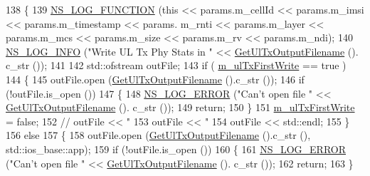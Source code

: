 \begin{DoxyCode}
138 \{
139   \hyperlink{log-macros-disabled_8h_a90b90d5bad1f39cb1b64923ea94c0761}{NS\_LOG\_FUNCTION} (\textcolor{keyword}{this} << params.m\_cellId << params.m\_imsi << params.m\_timestamp << params.
      m\_rnti << params.m\_layer << params.m\_mcs << params.m\_size << params.m\_rv << params.m\_ndi);
140   \hyperlink{group__logging_gafbd73ee2cf9f26b319f49086d8e860fb}{NS\_LOG\_INFO} (\textcolor{stringliteral}{"Write UL Tx Phy Stats in "} << \hyperlink{classns3_1_1PhyTxStatsCalculator_aeb929250f3932735ed8d7617f827cccc}{GetUlTxOutputFilename} ().
      c\_str ());
141 
142   std::ofstream outFile;
143   \textcolor{keywordflow}{if} ( \hyperlink{classns3_1_1PhyTxStatsCalculator_a1328443e41261755f0d22cdeef281ef5}{m\_ulTxFirstWrite} == \textcolor{keyword}{true} )
144     \{
145       outFile.open (\hyperlink{classns3_1_1PhyTxStatsCalculator_aeb929250f3932735ed8d7617f827cccc}{GetUlTxOutputFilename} ().c\_str ());
146       \textcolor{keywordflow}{if} (!outFile.is\_open ())
147         \{
148           \hyperlink{group__logging_ga0261a8db1d4ac5f79417d117634fd455}{NS\_LOG\_ERROR} (\textcolor{stringliteral}{"Can't open file "} << \hyperlink{classns3_1_1PhyTxStatsCalculator_aeb929250f3932735ed8d7617f827cccc}{GetUlTxOutputFilename} ().
      c\_str ());
149           \textcolor{keywordflow}{return};
150         \}
151       \hyperlink{classns3_1_1PhyTxStatsCalculator_a1328443e41261755f0d22cdeef281ef5}{m\_ulTxFirstWrite} = \textcolor{keyword}{false};
152 \textcolor{comment}{//       outFile << "%
153       outFile << \textcolor{stringliteral}{"%
154       outFile << std::endl;
155     \}
156   \textcolor{keywordflow}{else}
157     \{
158       outFile.open (\hyperlink{classns3_1_1PhyTxStatsCalculator_aeb929250f3932735ed8d7617f827cccc}{GetUlTxOutputFilename} ().c\_str (),  std::ios\_base::app);
159       \textcolor{keywordflow}{if} (!outFile.is\_open ())
160         \{
161           \hyperlink{group__logging_ga0261a8db1d4ac5f79417d117634fd455}{NS\_LOG\_ERROR} (\textcolor{stringliteral}{"Can't open file "} << \hyperlink{classns3_1_1PhyTxStatsCalculator_aeb929250f3932735ed8d7617f827cccc}{GetUlTxOutputFilename} ().
      c\_str ());
162           \textcolor{keywordflow}{return};
163         \}
}}
\end{DoxyCode}
